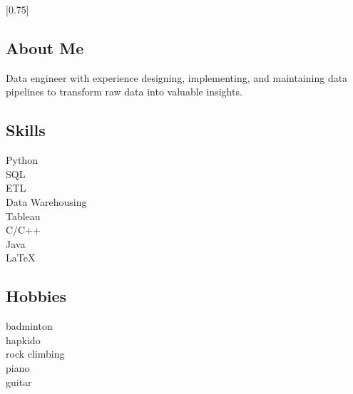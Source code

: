 \documentclass[lighthipster]{simplehipstercv}
\begin{document}
\setlength{\columnsep}{1.5cm}
[0.75]
\begin{paracol}{2}

\paracolbackgroundoptions



\footnotesize
{\setasidefontcolour
\flushright
\bigskip

\subsection*{About Me}
Data engineer with experience designing, implementing, and maintaining data pipelines to transform raw data into valuable insights. 

\bigskip




\subsection*{Skills}
Python \\
SQL \\
ETL \\
Data Warehousing \\
Tableau \\
C/C++ \\
Java \\
\LaTeX \\
\bigskip

\subsection*{Hobbies}
badminton \\
hapkido \\
rock climbing \\
piano\\
guitar \\


}
\end{paracol}
\end{document}

